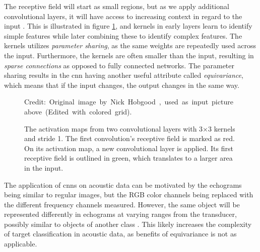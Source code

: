     The receptive field will start as small regions, but as we apply additional convolutional layers, it will have access to increasing context in regard to the input \cite{Goodfellow-et-al-2016}. This is illustrated in figure \ref{receptive_field_fig}, and kernels in early layers learn to identify simple features while later combining these to identify complex features. The kernels utilizes \textit{parameter sharing}, as the same weights are repeatedly used across the input. Furthermore, the kernels are often smaller than the input, resulting in \textit{sparse connections} as opposed to fully connected networks. The parameter sharing results in the \gls{cnn} having another useful attribute called \textit{equivariance}, which means that if the input changes, the output changes in the same way.
    \begin{figure}[H]
        \centering
        
        
        \caption[Receptive field]{The activation maps from two convolutional layers with 3×3 kernels and stride 1. The first convolution's receptive field is marked as red. On its activation map, a new convolutional layer is applied. Its first receptive field is outlined in green, which translates to a larger area in the input.}
      	\medskip 
        \hspace*{15pt}\hbox{\scriptsize Credit: Original image by Nick Hobgood \cite{clownfish_image}, used as input picture above (Edited with colored grid).}
        \label{receptive_field_fig}
    \end{figure}
   The application of \gls{cnn}s on acoustic data can be motivated by the echograms being similar to regular images, but the RGB color channels being replaced with the different frequency channels measured. However, the same object will be represented differently in echograms at varying ranges from the transducer, possibly similar to objects of another class \cite{simmonds2008fisheries}. This likely increases the complexity of target classification in acoustic data, as benefits of equivariance is not as applicable.
 
    


